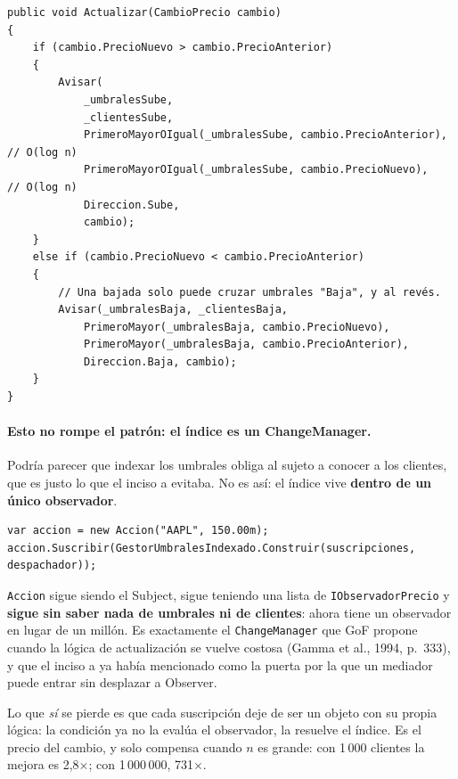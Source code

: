 \begin{lstlisting}[basicstyle=\ttfamily\footnotesize, columns=fullflexible, keepspaces=true, caption={\texttt{GestorUmbralesIndexado}: dos búsquedas binarias y el recorrido del tramo.}]
public void Actualizar(CambioPrecio cambio)
{
    if (cambio.PrecioNuevo > cambio.PrecioAnterior)
    {
        Avisar(
            _umbralesSube,
            _clientesSube,
            PrimeroMayorOIgual(_umbralesSube, cambio.PrecioAnterior),  // O(log n)
            PrimeroMayorOIgual(_umbralesSube, cambio.PrecioNuevo),     // O(log n)
            Direccion.Sube,
            cambio);
    }
    else if (cambio.PrecioNuevo < cambio.PrecioAnterior)
    {
        // Una bajada solo puede cruzar umbrales "Baja", y al revés.
        Avisar(_umbralesBaja, _clientesBaja,
            PrimeroMayor(_umbralesBaja, cambio.PrecioNuevo),
            PrimeroMayor(_umbralesBaja, cambio.PrecioAnterior),
            Direccion.Baja, cambio);
    }
}
\end{lstlisting}

\paragraph{Esto no rompe el patrón: el índice es un ChangeManager.}
Podría parecer que indexar los umbrales obliga al sujeto a conocer a los clientes, que es
justo lo que el inciso a evitaba. No es así: el índice vive \textbf{dentro de un único
observador}.

\begin{lstlisting}[basicstyle=\ttfamily\footnotesize, columns=fullflexible, keepspaces=true, numbers=none]
var accion = new Accion("AAPL", 150.00m);
accion.Suscribir(GestorUmbralesIndexado.Construir(suscripciones, despachador));
\end{lstlisting}

\texttt{Accion} sigue siendo el Subject, sigue teniendo una lista de
\texttt{IObservadorPrecio} y \textbf{sigue sin saber nada de umbrales ni de clientes}: ahora
tiene un observador en lugar de un millón. Es exactamente el \texttt{ChangeManager} que GoF
propone cuando la lógica de actualización se vuelve costosa (Gamma et al., 1994, p.~333), y
que el inciso a ya había mencionado como la puerta por la que un mediador puede entrar sin
desplazar a Observer.

Lo que \emph{sí} se pierde es que cada suscripción deje de ser un objeto con su propia
lógica: la condición ya no la evalúa el observador, la resuelve el índice. Es el precio del
cambio, y solo compensa cuando $n$ es grande: con 1\,000 clientes la mejora es
2,8$\times$; con 1\,000\,000, 731$\times$.

